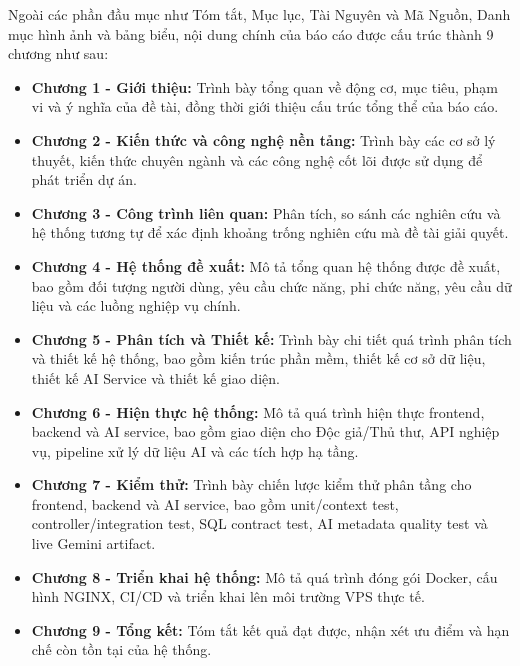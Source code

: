 Ngoài các phần đầu mục như Tóm tắt, Mục lục, Tài Nguyên và Mã Nguồn, Danh mục hình ảnh và bảng biểu, nội dung chính của báo cáo được cấu trúc thành 9 chương như sau:
\begin{itemize}
    \item \textbf{Chương 1 - Giới thiệu:} Trình bày tổng quan về động cơ, mục tiêu, phạm vi và ý nghĩa của đề tài, đồng thời giới thiệu cấu trúc tổng thể của báo cáo.

    \item \textbf{Chương 2 - Kiến thức và công nghệ nền tảng:} Trình bày các cơ sở lý thuyết, kiến thức chuyên ngành và các công nghệ cốt lõi được sử dụng để phát triển dự án.

    \item \textbf{Chương 3 - Công trình liên quan:} Phân tích, so sánh các nghiên cứu và hệ thống tương tự để xác định khoảng trống nghiên cứu mà đề tài giải quyết.

    \item \textbf{Chương 4 - Hệ thống đề xuất:} Mô tả tổng quan hệ thống được đề xuất, bao gồm đối tượng người dùng, yêu cầu chức năng, phi chức năng, yêu cầu dữ liệu và các luồng nghiệp vụ chính.

    \item \textbf{Chương 5 - Phân tích và Thiết kế:} Trình bày chi tiết quá trình phân tích và thiết kế hệ thống, bao gồm kiến trúc phần mềm, thiết kế cơ sở dữ liệu, thiết kế AI Service và thiết kế giao diện.

    \item \textbf{Chương 6 - Hiện thực hệ thống:} Mô tả quá trình hiện thực frontend, backend và AI service, bao gồm giao diện cho Độc giả/Thủ thư, API nghiệp vụ, pipeline xử lý dữ liệu AI và các tích hợp hạ tầng.

    \item \textbf{Chương 7 - Kiểm thử:} Trình bày chiến lược kiểm thử phân tầng cho frontend, backend và AI service, bao gồm unit/context test, controller/integration test, SQL contract test, AI metadata quality test và live Gemini artifact.

    \item \textbf{Chương 8 - Triển khai hệ thống:} Mô tả quá trình đóng gói Docker, cấu hình NGINX, CI/CD và triển khai lên môi trường VPS thực tế.

    \item \textbf{Chương 9 - Tổng kết:} Tóm tắt kết quả đạt được, nhận xét ưu điểm và hạn chế còn tồn tại của hệ thống.

\end{itemize}
